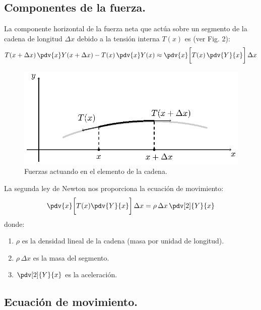 \subsection{Componentes de la fuerza.}

La componente horizontal de la fuerza neta que actúa sobre un segmento de la cadena de longitud $\Delta x$ debido a la tensión interna $T (x)$ es (ver Fig. 2):
\begin{align}
T (x  + \Delta x) \, \pdv{x} Y (x + \Delta x) - T (x) \, \pdv{x} Y (x) \approx \pdv{x} \bigg[ T (x) \, \pdv{Y}{x}  \bigg] \, \Delta x
\label{eq:ecuacion_02}
\end{align}

\begin{figure}[H]
    \centering
    \includegraphics[scale=1.3]{Imagenes/Cadena_Oscilante_02.eps}
    \caption{Fuerzas actuando en el elemento de la cadena.}
    \label{fig:figura_elemento_cadena}
\end{figure}

La segunda ley de Newton nos proporciona la ecuación de movimiento:
\begin{align}
\pdv{x} \bigg[ T (x) \pdv{Y}{x} \bigg] \, \Delta x = \rho \, \Delta x \, \pdv[2]{Y}{x}
\label{eq:ecuacion_03}
\end{align}
donde:
\begin{enumerate}[label=\alph*)]
\item $\rho$ es la densidad lineal de la cadena (masa por unidad de longitud).
\item $\rho \, \Delta x$  es la masa del segmento.
\item $\displaystyle \pdv[2]{Y}{x}$ es la aceleración.
\end{enumerate}

\subsection{Ecuación de movimiento.}

